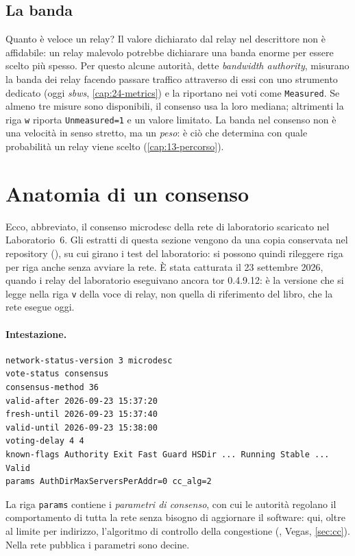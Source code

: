 \subsection{La banda}

Quanto è veloce un relay? Il valore dichiarato dal relay nel descrittore non è affidabile: un relay malevolo potrebbe dichiarare una banda enorme per essere scelto più spesso. Per questo alcune autorità, dette \emph{bandwidth authority}, misurano la banda dei relay facendo passare traffico attraverso di essi con uno strumento dedicato (oggi \emph{sbws}, \cref{cap:24-metrics}) e la riportano nei voti come \texttt{Measured}. Se almeno tre misure sono disponibili, il consenso usa la loro mediana; altrimenti la riga \texttt{w} riporta \texttt{Unmeasured=1} e un valore limitato. La banda nel consenso non è una velocità in senso stretto, ma un \emph{peso}: è ciò che determina con quale probabilità un relay viene scelto (\cref{cap:13-percorso}).

\section{Anatomia di un consenso}\label{sec:dir-anatomia}

Ecco, abbreviato, il consenso microdesc della rete di laboratorio scaricato nel Laboratorio~6. Gli estratti di questa sezione vengono da una copia conservata nel repository (), su cui girano i test del laboratorio: si possono quindi rileggere riga per riga anche senza avviare la rete. È stata catturata il 23 settembre 2026, quando i relay del laboratorio eseguivano ancora tor 0.4.9.12: è la versione che si legge nella riga \texttt{v} della voce di relay, non quella di riferimento del libro, che la rete esegue oggi.

\paragraph{Intestazione.}
\begin{lstlisting}[numbers=none]
network-status-version 3 microdesc
vote-status consensus
consensus-method 36
valid-after 2026-09-23 15:37:20
fresh-until 2026-09-23 15:37:40
valid-until 2026-09-23 15:38:00
voting-delay 4 4
known-flags Authority Exit Fast Guard HSDir ... Running Stable ... Valid
params AuthDirMaxServersPerAddr=0 cc_alg=2
\end{lstlisting}
La riga \texttt{params} contiene i \emph{parametri di consenso}, con cui le autorità regolano il comportamento di tutta la rete senza bisogno di aggiornare il software: qui, oltre al limite per indirizzo, l'algoritmo di controllo della congestione (, Vegas, \cref{sec:cc}). Nella rete pubblica i parametri sono decine.

